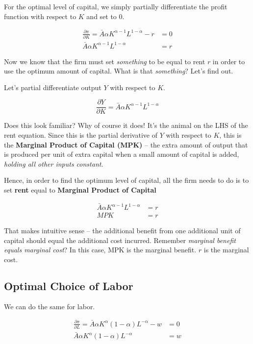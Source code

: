 \documentclass[11pt]{scrartcl}
\begin{document}
For the optimal level of capital, we simply partially differentiate the profit function with respect to $K$ and set to $0$.

\begin{align*}
\frac{\partial \pi}{\partial K} = \bar{A} \alpha K^{\alpha - 1}L^{1-\alpha} - r &= 0\\
\bar{A} \alpha K^{\alpha - 1}L^{1-\alpha} &= r
\end{align*}

Now we know that the firm must set \emph{something} to be equal to rent $r$ in order to use the optimum amount of capital. What is that \emph{something}? Let's find out.

Let's partial differentiate output $Y$ with respect to $K$.

\[ \frac{\partial Y}{\partial K} = \bar{A} \alpha K^{\alpha - 1}L^{1-\alpha} \]

Does this look familiar? Why of course it does! It's the animal on the LHS of the rent equation. Since this is the partial derivative of $Y$ with respect to $K$, this is the \textbf{Marginal Product of Capital (MPK)} -- the extra amount of output that is produced per unit of extra capital when a small amount of capital is added, \emph{holding all other inputs constant}.

Hence, in order to find the optimum level of capital, all the firm needs to do is to set \textbf{rent} equal to \textbf{Marginal Product of Capital}

\begin{align*}
\bar{A} \alpha K^{\alpha - 1}L^{1-\alpha} &= r \\
MPK &= r
\end{align*}

That makes intuitive sense -- the additional benefit from one additional unit of capital should equal the additional cost incurred. Remember \emph{marginal benefit equals marginal cost}? In this case, MPK is the marginal benefit. $r$ is the marginal cost.

\subsection{Optimal Choice of Labor}
We can do the same for labor.

\begin{align*}
\frac{\partial \pi}{\partial L} = \bar{A} \alpha K^{\alpha}(1-\alpha)L^{-\alpha} - w &= 0\\
\bar{A} \alpha K^{\alpha}(1-\alpha)L^{-\alpha} &= w\\
\end{align*}
\end{document}
